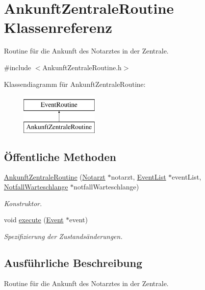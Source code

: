 \hypertarget{classAnkunftZentraleRoutine}{}\section{Ankunft\+Zentrale\+Routine Klassenreferenz}
\label{classAnkunftZentraleRoutine}


Routine für die Ankunft des Notarztes in der Zentrale.  




{\ttfamily \#include $<$Ankunft\+Zentrale\+Routine.\+h$>$}

Klassendiagramm für Ankunft\+Zentrale\+Routine\+:\begin{figure}[H]
\begin{center}
\leavevmode
\includegraphics[height=2.000000cm]{classAnkunftZentraleRoutine}
\end{center}
\end{figure}
\subsection*{Öffentliche Methoden}
\begin{DoxyCompactItemize}
\item 
\hyperlink{classAnkunftZentraleRoutine_a04a836512c946b6486b0c27500c3f220}{Ankunft\+Zentrale\+Routine} (\hyperlink{classNotarzt}{Notarzt} $\ast$notarzt, \hyperlink{classEventList}{Event\+List} $\ast$event\+List, \hyperlink{classNotfallWarteschlange}{Notfall\+Warteschlange} $\ast$notfall\+Warteschlange)
\begin{DoxyCompactList}\small\item\em Konstruktor. \end{DoxyCompactList}\item 
void \hyperlink{classAnkunftZentraleRoutine_ab6d6422067bb87d64f4973c68c6d796a}{execute} (\hyperlink{classEvent}{Event} $\ast$event)
\begin{DoxyCompactList}\small\item\em Spezifizierung der Zustandsänderungen. \end{DoxyCompactList}\end{DoxyCompactItemize}


\subsection{Ausführliche Beschreibung}
Routine für die Ankunft des Notarztes in der Zentrale. 

